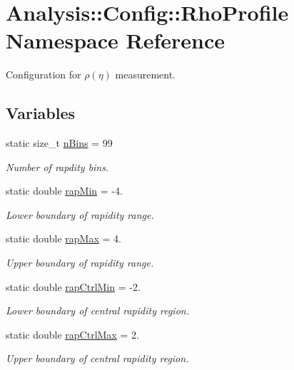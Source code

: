 \hypertarget{namespaceAnalysis_1_1Config_1_1RhoProfile}{}\section{Analysis\+:\+:Config\+:\+:Rho\+Profile Namespace Reference}
\label{namespaceAnalysis_1_1Config_1_1RhoProfile}


Configuration for $ \rho(\eta) $ measurement.  


\subsection*{Variables}
\begin{DoxyCompactItemize}
\item 
static size\+\_\+t \hyperlink{namespaceAnalysis_1_1Config_1_1RhoProfile_aed9bc5e8b5b6b35cf2eb5462c04c4221}{n\+Bins} = 99
\begin{DoxyCompactList}\small\item\em Number of rapdity bins. \end{DoxyCompactList}\item 
static double \hyperlink{namespaceAnalysis_1_1Config_1_1RhoProfile_a75f726356d3f7bb7894942b568f83123}{rap\+Min} = -\/4.
\begin{DoxyCompactList}\small\item\em Lower boundary of rapidity range. \end{DoxyCompactList}\item 
static double \hyperlink{namespaceAnalysis_1_1Config_1_1RhoProfile_aee14811464e345a118e1e64077014c2d}{rap\+Max} = 4.
\begin{DoxyCompactList}\small\item\em Upper boundary of rapidity range. \end{DoxyCompactList}\item 
static double \hyperlink{namespaceAnalysis_1_1Config_1_1RhoProfile_a6a12ebe70b6648825eead16dff1159fd}{rap\+Ctrl\+Min} = -\/2.
\begin{DoxyCompactList}\small\item\em Lower boundary of central rapidity region. \end{DoxyCompactList}\item 
static double \hyperlink{namespaceAnalysis_1_1Config_1_1RhoProfile_ab78a2585916e0761da7090b86d5c762b}{rap\+Ctrl\+Max} = 2.
\begin{DoxyCompactList}\small\item\em Upper boundary of central rapidity region. \end{DoxyCompactList}\item 

\end{DoxyCompactItemize}

